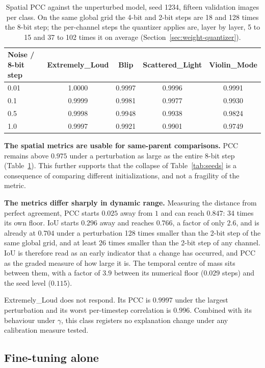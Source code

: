 \begin{table}[htbp]
\centering
\begin{tabular}{lcccc}
\toprule
Noise / 8-bit step & Extremely\_Loud & Blip & Scattered\_Light & Violin\_Mode \\
\midrule
0.01 & 1.0000 & 0.9997 & 0.9996 & 0.9991 \\
0.1  & 0.9999 & 0.9981 & 0.9977 & 0.9930 \\
0.5  & 0.9998 & 0.9948 & 0.9938 & 0.9824 \\
1.0  & 0.9997 & 0.9921 & 0.9901 & 0.9749 \\
\bottomrule
\end{tabular}
\caption{Spatial PCC against the unperturbed model, seed 1234, fifteen validation
images per class. On the same global grid the 4-bit and 2-bit steps are 18 and 128
times the 8-bit step; the per-channel steps the quantizer applies are, layer by
layer, 5 to 15 and 37 to 102 times it on average
(Section~\ref{sec:weight-quantizer}).}
\label{tab:perturbation}
\end{table}

\textbf{The spatial metrics are usable for same-parent comparisons.}
PCC remains above $0.975$ under a perturbation as large as the entire 8-bit step
(Table~\ref{tab:perturbation}). This further supports that the collapse of Table~\ref{tab:seeds} is a
consequence of comparing different initializations, and not a fragility of the
metric.

\textbf{The metrics differ sharply in dynamic range.} Measuring the distance from
perfect agreement, PCC starts $0.025$ away from $1$ and can reach $0.847$: 34
times its own floor. IoU starts $0.296$ away and reaches $0.766$, a factor of
only $2.6$, and is already at $0.704$ under a perturbation 128 times smaller than
the 2-bit step of the same global grid, and at least 26 times smaller than the
2-bit step of any channel. IoU is therefore read as an early indicator that a
change has occurred, and PCC as the graded measure of how large it is. The
temporal centre of mass sits between them, with a factor of $3.9$ between its
numerical floor ($0.029$ steps) and the seed level ($0.115$).

Extremely\_Loud does not respond. Its PCC is $0.9997$ under the largest
perturbation and its worst per-timestep correlation is $0.996$. Combined with its
behaviour under $\gamma$, this class registers no explanation change under any
calibration measure tested.

\subsection{Fine-tuning alone}
\label{sec:anchor}

